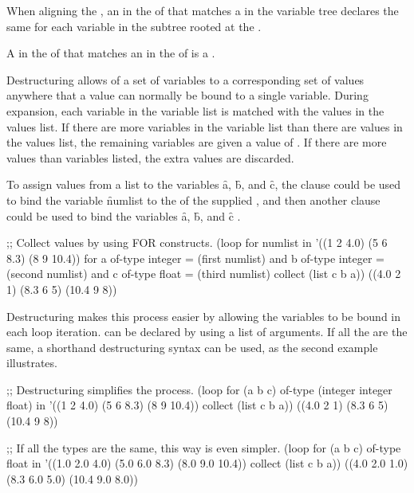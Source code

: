 \beginlist 
\itemitem{\bull}
When aligning the , an  in the
 of  that matches a  
in the variable tree declares the same  for each variable
in the subtree rooted at the .
 
\itemitem{\bull} 
A  in the  of  that 
matches an  in the  of  
is a .
 
\endlist
 
Destructuring allows  of a set of variables to a corresponding
set of values anywhere that a value can normally be bound to a single
variable.  During  expansion, 
each variable in the variable list
is matched with the values in the values list.  If there are more variables
in the variable list than there are values in the values list, the 
remaining variables are given a value of \nil.  If there are more
values than variables listed, the extra values are discarded.

 
To assign values from a list to the variables \f{a},
\f{b}, and \f{c}, the  clause could be used to
bind the variable \f{numlist} to the 
 of the supplied ,
and then another  clause could be used to bind the variables
\f{a}, \f{b}, and \f{c} .  

\code
;; Collect values by using FOR constructs.
 (loop for numlist in '((1 2 4.0) (5 6 8.3) (8 9 10.4))
       for a of-type integer = (first numlist)
       and b of-type integer = (second numlist)
       and c of-type float = (third numlist)
       collect (list c b a))
\EV ((4.0 2 1) (8.3 6 5) (10.4 9 8))
\endcode
{}
 
Destructuring makes this process easier by allowing the variables to
be bound in each loop iteration.  
 can be declared by using a 
list of  arguments.  If 
all the 
are the same, a shorthand destructuring syntax can be used, as the second
example illustrates.

\code
;; Destructuring simplifies the process.
 (loop for (a b c) of-type (integer integer float) in
       '((1 2 4.0) (5 6 8.3) (8 9 10.4))
       collect (list c b a))
\EV ((4.0 2 1) (8.3 6 5) (10.4 9 8))
 

;; If all the types are the same, this way is even simpler.
 (loop for (a b c) of-type float in
       '((1.0 2.0 4.0) (5.0 6.0 8.3) (8.0 9.0 10.4))
       collect (list c b a))
\EV ((4.0 2.0 1.0) (8.3 6.0 5.0) (10.4 9.0 8.0))
\endcode
 
